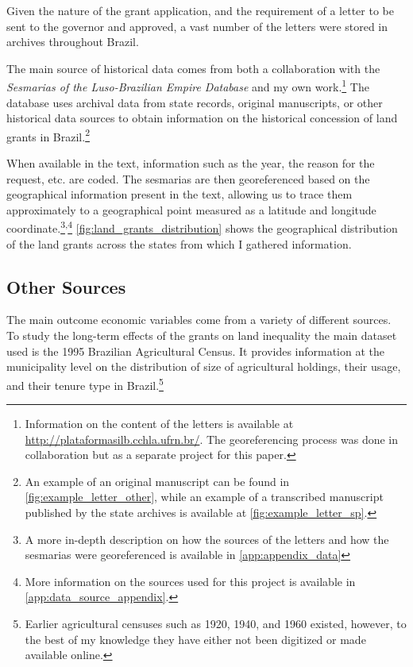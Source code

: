 \documentclass{article}
\begin{document}
Given the nature of the grant application, and the requirement of a letter to be sent to the governor and approved, a vast number of the letters were stored in archives throughout Brazil. 

The main source of historical data comes from both a collaboration with the \textit{Sesmarias of the Luso-Brazilian Empire Database} and my own work.\footnote{
  Information on the content of the letters is available at \url{http://plataformasilb.cchla.ufrn.br/}. The georeferencing process was done in collaboration but as a separate project for this paper.}
The database uses archival data from state records, original manuscripts, or other historical data sources to obtain information on the historical concession of land grants in Brazil.\footnote{An example of an original manuscript can be found in \autoref{fig:example_letter_other}, while an example of a transcribed manuscript published by the state archives is available at \autoref{fig:example_letter_sp}.}

When available in the text, information such as the year, the reason for the request, etc. are coded. 
The sesmarias are then georeferenced based on the geographical information present in the text, allowing us to trace them approximately to a geographical point measured as a latitude and longitude coordinate.\footnote{A more in-depth description on how the sources of the letters and how the sesmarias were georeferenced is available in \autoref{app:appendix_data}}\textsuperscript{,}\footnote{More information on the sources used for this project is available in \autoref{app:data_source_appendix}.} \autoref{fig:land_grants_distribution} shows the geographical distribution of the land grants across the states from which I gathered information. 

\subsection{Other Sources}

The main outcome economic variables come from a variety of different sources. 
To study the long-term effects of the grants on land inequality the main dataset used is the 1995 Brazilian Agricultural Census.
It provides information at the municipality level on the distribution of size of agricultural holdings, their usage, and their tenure type in Brazil.\footnote{Earlier agricultural censuses such as 1920, 1940, and 1960 existed, however, to the best of my knowledge they have either not been digitized or made available online.}
\end{document}
